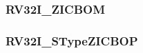 \subsubsection[{\small RV32I\_ZICBOM}]{RV32I\_ZICBOM} \label{sec:format-RV32I-ZICBOM}



\subsubsection[{\small RV32I\_STypeZICBOP}]{RV32I\_STypeZICBOP} \label{sec:format-RV32I-STypeZICBOP}



